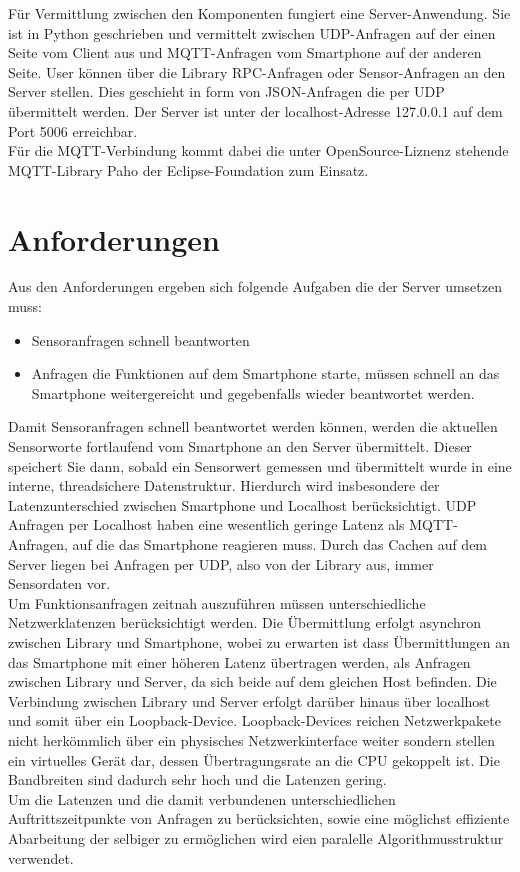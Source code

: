 \documentclass[11pt,a4paper]{report}
\begin{document}
Für Vermittlung zwischen den Komponenten fungiert eine Server-Anwendung.
Sie ist in Python geschrieben und vermittelt zwischen UDP-Anfragen auf der einen Seite vom Client aus und MQTT-Anfragen vom Smartphone auf der anderen Seite.
User können über die Library RPC-Anfragen oder Sensor-Anfragen an den Server stellen.
Dies geschieht in form von JSON-Anfragen die per UDP übermittelt werden.
Der Server ist unter der localhost-Adresse 127.0.0.1 auf dem Port 5006 erreichbar.
\\
Für die MQTT-Verbindung kommt dabei die unter OpenSource-Liznenz stehende MQTT-Library Paho der Eclipse-Foundation zum Einsatz. \cite{paho}


\section{Anforderungen}
Aus den Anforderungen ergeben sich folgende Aufgaben die der Server umsetzen muss:
\begin{itemize}
\item Sensoranfragen schnell beantworten
\item Anfragen die Funktionen auf dem Smartphone starte, müssen schnell an das Smartphone weitergereicht und gegebenfalls wieder beantwortet werden.
\end{itemize}
Damit Sensoranfragen schnell beantwortet werden können, werden die aktuellen Sensorworte fortlaufend vom Smartphone an den Server übermittelt.
Dieser speichert Sie dann, sobald ein Sensorwert gemessen und übermittelt wurde in eine interne, threadsichere Datenstruktur.
Hierdurch wird insbesondere der Latenzunterschied zwischen Smartphone und Localhost berücksichtigt.
UDP Anfragen per Localhost haben eine wesentlich geringe Latenz als MQTT-Anfragen, auf die das Smartphone reagieren muss.
Durch das Cachen auf dem Server liegen bei Anfragen per UDP, also von der Library aus, immer Sensordaten vor.
\\
Um Funktionsanfragen zeitnah auszuführen müssen unterschiedliche Netzwerklatenzen berücksichtigt werden.
Die Übermittlung erfolgt asynchron zwischen Library und Smartphone, wobei zu erwarten ist dass Übermittlungen an das Smartphone mit einer höheren Latenz übertragen werden, als Anfragen zwischen Library und Server, da sich beide auf dem gleichen Host befinden.
Die Verbindung zwischen Library und Server erfolgt darüber hinaus über localhost und somit über ein Loopback-Device.
Loopback-Devices reichen Netzwerkpakete nicht herkömmlich über ein physisches Netzwerkinterface weiter sondern stellen ein virtuelles Gerät dar, dessen Übertragungsrate an die CPU gekoppelt ist.
Die Bandbreiten sind dadurch sehr hoch und die Latenzen gering.
\\
Um die Latenzen und die damit verbundenen unterschiedlichen Auftrittszeitpunkte von Anfragen zu berücksichten, sowie eine möglichst effiziente Abarbeitung der selbiger zu ermöglichen wird eien paralelle Algorithmusstruktur verwendet.
\end{document}
